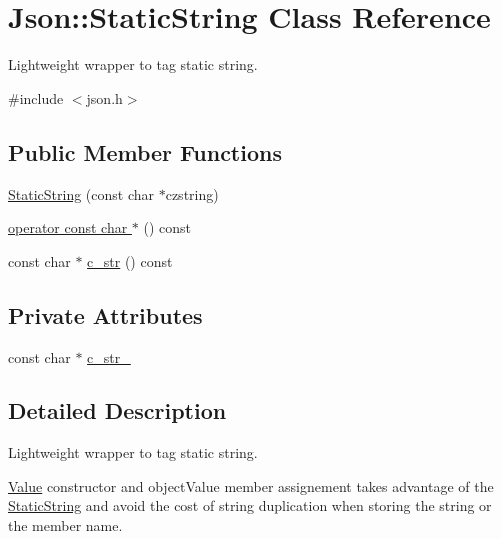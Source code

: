 \hypertarget{classJson_1_1StaticString}{}\section{Json\+:\+:Static\+String Class Reference}
\label{classJson_1_1StaticString}


Lightweight wrapper to tag static string.  




{\ttfamily \#include $<$json.\+h$>$}

\subsection*{Public Member Functions}
\begin{DoxyCompactItemize}
\item 
\hyperlink{classJson_1_1StaticString_afb6baf1ec078ce76f0b0f9b39d19437f_afb6baf1ec078ce76f0b0f9b39d19437f}{Static\+String} (const char $\ast$czstring)
\item 
\hyperlink{classJson_1_1StaticString_a256a6cc0c630aef670848a0f11707b62_a256a6cc0c630aef670848a0f11707b62}{operator const char $\ast$} () const
\item 
const char $\ast$ \hyperlink{classJson_1_1StaticString_ad6be703d432d108623bb0aa06b0b90ca_ad6be703d432d108623bb0aa06b0b90ca}{c\+\_\+str} () const
\end{DoxyCompactItemize}
\subsection*{Private Attributes}
\begin{DoxyCompactItemize}
\item 
const char $\ast$ \hyperlink{classJson_1_1StaticString_a9f0d9e8caee8f8db14e2c8c24760dffd_a9f0d9e8caee8f8db14e2c8c24760dffd}{c\+\_\+str\+\_\+}
\end{DoxyCompactItemize}


\subsection{Detailed Description}
Lightweight wrapper to tag static string. 

\hyperlink{classJson_1_1Value}{Value} constructor and object\+Value member assignement takes advantage of the \hyperlink{classJson_1_1StaticString}{Static\+String} and avoid the cost of string duplication when storing the string or the member name.

